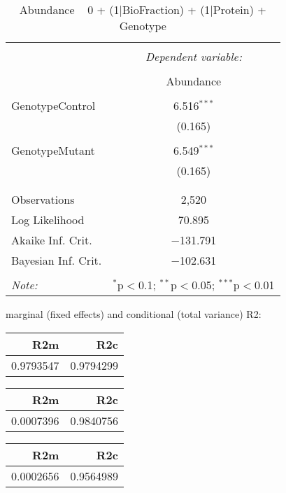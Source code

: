 \documentclass[11pt]{report}
\begin{document}
\begin{table}[!htbp] \centering 
  \caption{Abundance ~ 0 + (1|BioFraction) + (1|Protein) + Genotype} 
  \label{} 
\begin{tabular}{@{\extracolsep{5pt}}lc} 
\\[-1.8ex]\hline 
\hline \\[-1.8ex] 
 & \multicolumn{1}{c}{\textit{Dependent variable:}} \\ 
\cline{2-2} 
\\[-1.8ex] & Abundance \\ 
\hline \\[-1.8ex] 
 GenotypeControl & 6.516$^{***}$ \\ 
  & (0.165) \\ 
  & \\ 
 GenotypeMutant & 6.549$^{***}$ \\ 
  & (0.165) \\ 
  & \\ 
\hline \\[-1.8ex] 
Observations & 2,520 \\ 
Log Likelihood & 70.895 \\ 
Akaike Inf. Crit. & $-$131.791 \\ 
Bayesian Inf. Crit. & $-$102.631 \\ 
\hline 
\hline \\[-1.8ex] 
\textit{Note:}  & \multicolumn{1}{r}{$^{*}$p$<$0.1; $^{**}$p$<$0.05; $^{***}$p$<$0.01} \\ 
\end{tabular} 
\end{table} 
marginal (fixed effects) and conditional (total variance) R2:

\begin{tabular}{r|r}
\hline
R2m & R2c\\
\hline
0.9793547 & 0.9794299\\
\hline
\end{tabular}

\begin{tabular}{r|r}
\hline
R2m & R2c\\
\hline
0.0007396 & 0.9840756\\
\hline
\end{tabular}

\begin{tabular}{r|r}
\hline
R2m & R2c\\
\hline
0.0002656 & 0.9564989\\
\hline
\end{tabular}
\end{document}
